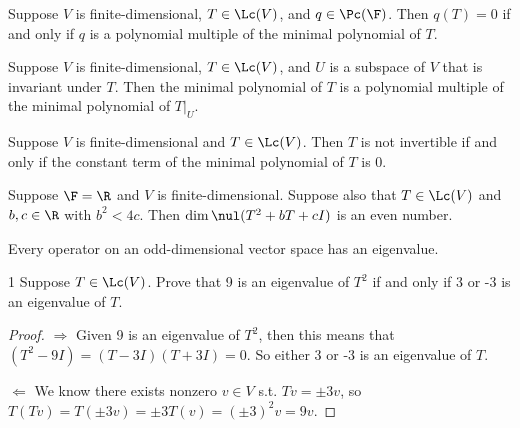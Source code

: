 \documentclass{extarticle}
\begin{document}
\begin{thm}[\(q(T) = 0 \Longleftrightarrow q\) is a polynomial multiple of the minimal polynomial]
    Suppose \(V\) is finite-dimensional, \(T \in \Lc(V)\), and \(q \in \Pc(\F)\). Then 
    \(q(T) = 0\) if and only if \(q\) is a polynomial multiple of the minimal polynomial of \(T\).
\end{thm}

\begin{thm}
    Suppose \(V\) is finite-dimensional, \(T \in \Lc(V)\), and \(U\) is a subspace of \(V\) that is invariant 
    under \(T\). Then the minimal polynomial of \(T\) is a polynomial multiple of the minimal polynomial of 
    \(T |_U\).
\end{thm}

\begin{corollary}
    Suppose \(V\) is finite-dimensional and \(T \in \Lc(V)\). Then \(T\) is not invertible if and only if the 
    constant term of the minimal polynomial of \(T\) is 0.
\end{corollary}

\begin{thm}
    Suppose \(\F = \R\) and \(V\) is finite-dimensional. Suppose also that \(T \in \Lc(V)\) and 
    \(b, c \in \R\) with \(b^2 < 4c\). Then \(\dim \nul(T^2 + bT +cI)\) is an even number.
\end{thm}

\begin{thm}
    Every operator on an odd-dimensional vector space has an eigenvalue. 
\end{thm}


\newpage 
{}

\begin{problem}{1}
    Suppose \(T \in \Lc(V)\). Prove that 9 is an eigenvalue of \(T^2\) if and only if 3 or -3 is an eigenvalue 
    of \(T\). 
\end{problem}

\begin{proof}
\(\Rightarrow\) Given 9 is an eigenvalue of \(T^2\), then this means that \((T^2 - 9I) = (T - 3I)(T+3I) = 0\). 
So either 3 or -3 is an eigenvalue of \(T\). 

\(\Leftarrow\) We know there exists nonzero \(v \in V\) s.t. \(Tv = \pm 3v\), so \(T(Tv) = T( \pm 3v) 
= \pm 3 T(v) = (\pm 3)^2 v = 9v\).
\end{proof}
\end{document}
